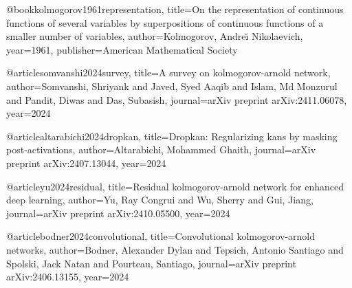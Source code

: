 @book{kolmogorov1961representation,
  title={On the representation of continuous functions of several variables by superpositions of continuous functions of a smaller number of variables},
  author={Kolmogorov, Andre{\u\i} Nikolaevich},
  year={1961},
  publisher={American Mathematical Society}
}

@article{somvanshi2024survey,
  title={A survey on kolmogorov-arnold network},
  author={Somvanshi, Shriyank and Javed, Syed Aaqib and Islam, Md Monzurul and Pandit, Diwas and Das, Subasish},
  journal={arXiv preprint arXiv:2411.06078},
  year={2024}
}

@article{altarabichi2024dropkan,
  title={Dropkan: Regularizing kans by masking post-activations},
  author={Altarabichi, Mohammed Ghaith},
  journal={arXiv preprint arXiv:2407.13044},
  year={2024}
}

@article{yu2024residual,
  title={Residual kolmogorov-arnold network for enhanced deep learning},
  author={Yu, Ray Congrui and Wu, Sherry and Gui, Jiang},
  journal={arXiv preprint arXiv:2410.05500},
  year={2024}
}

@article{bodner2024convolutional,
  title={Convolutional kolmogorov-arnold networks},
  author={Bodner, Alexander Dylan and Tepsich, Antonio Santiago and Spolski, Jack Natan and Pourteau, Santiago},
  journal={arXiv preprint arXiv:2406.13155},
  year={2024}
}